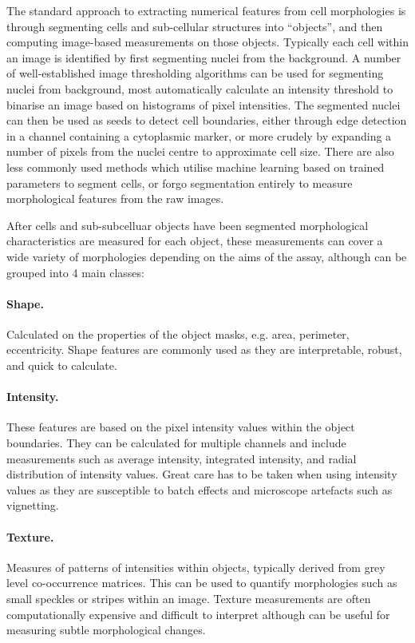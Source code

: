 \documentclass[a4paper,11pt,twoside,openright]{scrbook}
\begin{document}
The standard approach to extracting numerical features from cell morphologies is through segmenting cells and 
sub-cellular structures into ``objects'', and then computing image-based measurements on those objects.
Typically each cell within an image is identified by first segmenting nuclei from the background.
A number of well-established image thresholding algorithms can be used for segmenting nuclei from background, most 
automatically calculate an intensity threshold to binarise an image based on histograms of pixel 
intensities.\cite{Otsu1979,Padmanabhan2010}
The segmented nuclei can then be used as seeds to detect cell boundaries, either through edge detection in a channel 
containing a cytoplasmic marker, or more crudely by expanding a number of pixels from the nuclei centre to approximate 
cell size.
There are also less commonly used methods which utilise machine learning based on trained parameters to segment cells, 
\cite{Sommer2011} or forgo segmentation entirely to measure morphological features from the raw images. 
\cite{Rajaram2012,Orlov2008}

After cells and sub-subcelluar objects have been segmented morphological characteristics are measured for each object, 
these measurements can cover a wide variety of morphologies depending on the aims of the assay, although can be grouped 
into 4 main classes:

\paragraph{Shape.}
Calculated on the properties of the object masks, e.g. area, perimeter, eccentricity. Shape features are commonly used 
as they are interpretable, robust, and quick to calculate.

\paragraph{Intensity.}
These features are based on the pixel intensity values within the object boundaries.
They can be calculated for multiple channels and include measurements such as average intensity, integrated intensity, 
and radial distribution of intensity values.
Great care has to be taken when using intensity values as they are susceptible to batch effects and microscope 
artefacts such as vignetting. \cite{Goldman2010}

\paragraph{Texture.}
Measures of patterns of intensities within objects, typically derived from grey level co-occurrence matrices. 
\cite{Haralick1973} 
This can be used to quantify morphologies such as small speckles or stripes within an image.
Texture measurements are often computationally expensive and difficult to interpret although can be useful for 
measuring subtle morphological changes.
\end{document}
